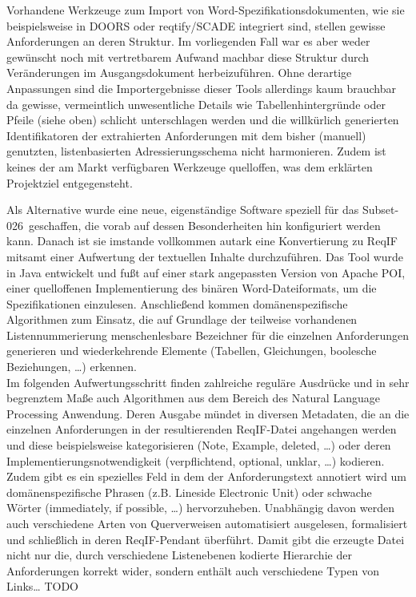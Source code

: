 \documentclass[twoside]{article}
\begin{document}
\begin{multicols}{2}
Vorhandene Werkzeuge zum Import von Word-Spezifikationsdokumenten, wie sie beispielsweise in DOORS oder reqtify/SCADE integriert sind, stellen gewisse Anforderungen an deren Struktur. Im vorliegenden Fall war es aber weder gewünscht noch mit vertretbarem Aufwand machbar diese Struktur durch Veränderungen im Ausgangsdokument herbeizuführen. Ohne derartige Anpassungen sind die Importergebnisse dieser Tools allerdings kaum brauchbar da gewisse, vermeintlich unwesentliche Details wie Tabellenhintergründe oder Pfeile (siehe oben) schlicht unterschlagen werden und die willkürlich generierten Identifikatoren der extrahierten Anforderungen mit dem bisher (manuell) genutzten, listenbasierten Adressierungsschema nicht harmonieren. Zudem ist keines der am Markt verfügbaren Werkzeuge quelloffen, was dem erklärten Projektziel entgegensteht.

Als Alternative wurde eine neue, eigenständige Software speziell für das \glqq Subset-026\grqq\ geschaffen, die vorab auf dessen Besonderheiten hin konfiguriert werden kann. Danach ist sie imstande vollkommen autark eine Konvertierung zu ReqIF mitsamt einer Aufwertung der textuellen Inhalte durchzuführen. Das Tool wurde in Java entwickelt und fußt auf einer stark angepassten Version von Apache POI, einer quelloffenen Implementierung des binären Word-Dateiformats, um die Spezifikationen einzulesen. Anschließend kommen domänenspezifische Algorithmen zum Einsatz, die auf Grundlage der teilweise vorhandenen Listennummerierung menschenlesbare Bezeichner für die einzelnen Anforderungen generieren und wiederkehrende Elemente (Tabellen, Gleichungen, boolesche Beziehungen, \ldots ) erkennen.\\
Im folgenden Aufwertungsschritt finden zahlreiche reguläre Ausdrücke und in sehr begrenztem Maße auch Algorithmen aus dem Bereich des Natural Language Processing Anwendung. Deren Ausgabe mündet in diversen Metadaten, die an die einzelnen Anforderungen in der resultierenden ReqIF-Datei angehangen werden und diese beispielsweise kategorisieren (Note, Example, deleted, \ldots ) oder deren Implementierungsnotwendigkeit (verpflichtend, optional, unklar, \ldots ) kodieren. Zudem gibt es ein spezielles Feld in dem der Anforderungstext annotiert wird um domänenspezifische Phrasen (z.B. \glqq Lineside Electronic Unit\grqq ) oder schwache Wörter (\glqq immediately\grqq , \glqq if possible\grqq , \ldots ) hervorzuheben. Unabhängig davon werden auch verschiedene Arten von Querverweisen automatisiert ausgelesen, formalisiert und schließlich in deren ReqIF-Pendant überführt. Damit gibt die erzeugte Datei nicht nur die, durch verschiedene Listenebenen kodierte Hierarchie der Anforderungen korrekt wider, sondern enthält auch verschiedene Typen von Links\ldots
TODO


\end{multicols}
\end{document}

